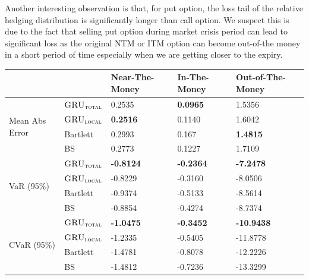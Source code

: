 \documentclass[letterpaper,12pt,titlepage,oneside,final]{book}
\numberwithin{equation}{section}
\theoremstyle{definition}
\newcommand{\modelT}{\textsc{GRU}_{\textsc{total}}}
\newcommand{\modelL}{\textsc{GRU}_{\textsc{local}}}
\begin{document}
Another interesting observation is that, for put option, the loss tail of the relative hedging distribution is significantly longer than call option. We suspect this is due to the fact that selling put option during market crisis period can lead to significant loss as the original NTM or ITM option can become out-of-the money in a short period of time especially when we are getting closer to the expiry.
\begin{table}[htp!]
	\centering
	\begin{tabular}{ll|l|l|l|}
		\cline{3-5}
		&          & Near-The-Money   & In-The-Money     & Out-of-The-Money  \\ \hline
		\multicolumn{1}{|l|}{\multirow{4}{*}{Mean Abs Error}} & $\modelT$    & 0.2535           & \textbf{0.0965}  & 1.5356   \\ 
		\multicolumn{1}{|l|}{}                                & $\modelL$    & \textbf{0.2516}  & 0.1140           & 1.6042             \\ 
		\multicolumn{1}{|l|}{}                                & Bartlett     & 0.2993 			& 0.167  		   & \textbf{1.4815}       \\ 
		\multicolumn{1}{|l|}{}                                & BS       	 & 0.2773 		    & 0.1227 		   & 1.7109            \\ 
		\hline
		\multicolumn{1}{|l|}{\multirow{4}{*}{VaR (95\%)}}     & $\modelT$    & \textbf{-0.8124} & \textbf{-0.2364} & \textbf{-7.2478}  \\ 
		\multicolumn{1}{|l|}{}                                & $\modelL$    & -0.8229          & -0.3160          & -8.0506           \\ 
		\multicolumn{1}{|l|}{}                                & Bartlett 	 & -0.9374 			& -0.5133 		   &-8.5614           \\  
		\multicolumn{1}{|l|}{}                                & BS       	 & -0.8854 			& -0.4274 		   &-8.7374           \\ 
		\hline
		\multicolumn{1}{|l|}{\multirow{4}{*}{CVaR (95\%)}}    & $\modelT$    & \textbf{-1.0475} & \textbf{-0.3452} & \textbf{-10.9438} \\ 
		\multicolumn{1}{|l|}{}                                & $\modelL$    & -1.2335          & -0.5405          & -11.8778          \\  
		\multicolumn{1}{|l|}{}                                & Bartlett 	 & -1.4781  		&-0.8078 		   &-12.2226          \\  
		\multicolumn{1}{|l|}{}                                & BS       	 &  -1.4812  		&-0.7236 		   &-13.3299          \\ 

\end{tabular}
\end{table}
\end{document}
